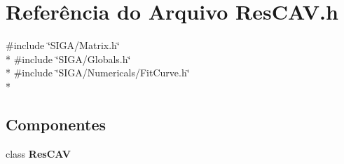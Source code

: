 \section{Referência do Arquivo Res\+C\+A\+V.\+h}
\label{_c_a_v_2_res_c_a_v_8h}
{\ttfamily \#include \char`\"{}S\+I\+G\+A/\+Matrix.\+h\char`\"{}}\\*
{\ttfamily \#include \char`\"{}S\+I\+G\+A/\+Globals.\+h\char`\"{}}\\*
{\ttfamily \#include \char`\"{}S\+I\+G\+A/\+Numericals/\+Fit\+Curve.\+h\char`\"{}}\\*
\subsection*{Componentes}
\begin{DoxyCompactItemize}
\item 
class {\bf Res\+C\+AV}
\end{DoxyCompactItemize}

